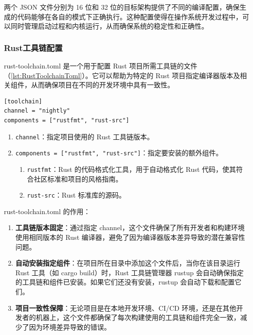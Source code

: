 两个 JSON 文件分别为 16 位和 32 位的目标架构提供了不同的编译配置，确保生成的代码能够在各自的模式下正确执行。这种配置使得在操作系统开发过程中，可以同时管理启动过程和内核运行，从而确保系统的稳定性和正确性。

\subsubsection{Rust工具链配置}

rust-toolchain.toml 是一个用于配置 Rust 项目所需工具链的文件（\cref{lst:RustToolchainToml}）。它可以帮助为特定的 Rust 项目指定编译器版本及相关组件，从而确保项目在不同的开发环境中具有一致性。

\begin{listing}[htbp]
    \begin{verbatim}
[toolchain]
channel = "nightly"
components = ["rustfmt", "rust-src"]
    \end{verbatim}
    \caption{rust-toolchain.toml配置文件}\label{lst:RustToolchainToml}
\end{listing}

\begin{enumerate}
    \item \texttt{channel}：指定项目使用的 Rust 工具链版本。
    \item \texttt{components = ["rustfmt", "rust-src"]}：指定要安装的额外组件。
          \begin{enumerate}
              \item \texttt{rustfmt}：Rust 的代码格式化工具，用于自动格式化 Rust 代码，使其符合社区标准和项目的风格指南。
              \item \texttt{rust-src}：Rust 标准库的源码。
          \end{enumerate}
\end{enumerate}

rust-toolchain.toml 的作用：

\begin{enumerate}
    \item \textbf{工具链版本固定}：通过指定 channel，这个文件确保了所有开发者和构建环境使用相同版本的 Rust 编译器，避免了因为编译器版本差异导致的潜在兼容性问题。
    \item \textbf{自动安装指定组件}：在项目所在目录中添加这个文件后，当你在该目录运行 Rust 工具（如 cargo build）时，Rust 工具链管理器 rustup 会自动确保指定的工具链和组件已安装。如果它们还没有安装，rustup 会自动下载和配置它们。
    \item \textbf{项目一致性保障}：无论项目是在本地开发环境、CI/CD 环境，还是在其他开发者的机器上，这个文件都确保了每次构建使用的工具链和组件完全一致，减少了因为环境差异导致的错误。
\end{enumerate}

